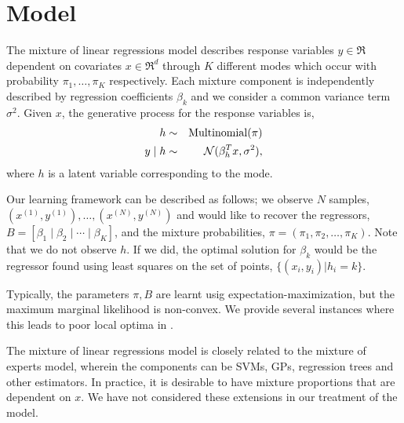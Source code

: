 \section{Model}
\label{sec:model}

\newcommand{\xn}[1]{x^{(#1)}}
\newcommand{\xni}{\xn{i}}
\newcommand{\yn}[1]{y^{(#1)}}
\newcommand{\yni}{\yn{i}}

The mixture of linear regressions model\citep{VieleTong} describes
response variables $y \in \Re$ dependent on covariates $x \in \Re^d$
through $K$ different modes which occur with probability $\pi_1, \dots,
\pi_K$ respectively. Each mixture component is independently described
by regression coefficients $\beta_k$ and we consider a common variance
term $\sigma^2$. Given $x$, the generative process for the response
variables is,
\begin{eqnarray*}
  h &\sim& \operatorname{Multinomial}(\pi) \\
  y \mid h &\sim& \mathcal{N}( \beta_{h}^T x,  \sigma^2 ),
\end{eqnarray*}
where $h$ is a latent variable corresponding to the mode.

Our learning framework can be described as follows; we observe $N$
samples, $(\xn{1}, \yn{1}), \dots, (\xn{N}, \yn{N})$ and would like to
recover the regressors, $B = [\beta_1 \mid \beta_2 \mid \cdots \mid
\beta_K]$, and the mixture probabilities, $\pi = (\pi_1, \pi_2, \dots,
\pi_K)$. Note that we do not observe $h$. If we did, the optimal
solution for $\beta_k$ would be the regressor found using least squares
on the set of points, $\{(x_i, y_i) | h_i = k \}$.

Typically, the parameters $\pi, B$ are learnt usig
expectation-maximization\cite{VieleTong}, but the maximum marginal
likelihood is non-convex. We provide several instances where this leads
to poor local optima in .

The mixture of linear regressions model is closely related to the
mixture of experts model\citationneeded, wherein the components can be
SVMs, GPs, regression trees and other estimators. In practice, it is
desirable to have mixture proportions that are dependent on $x$. We have
not considered these extensions in our treatment of the model.

